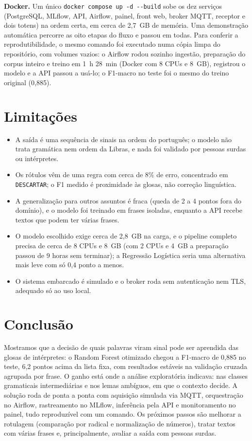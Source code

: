 \documentclass[12pt]{article}
\begin{document}
\textbf{Docker.} Um único \texttt{docker compose up -d -{}-build} sobe os dez serviços (PostgreSQL,
MLflow, API, Airflow, painel, front web, broker MQTT, receptor e dois totens) na ordem certa, em cerca de
2,7~GB de memória. Uma demonstração automática percorre as oito etapas do fluxo e passou em todas.
Para conferir a reprodutibilidade, o mesmo comando foi executado numa cópia limpa do repositório, com
volumes vazios: o Airflow rodou sozinho ingestão, preparação do corpus inteiro e treino em 1~h 28~min
(Docker com 8 CPUs e 8~GB), registrou o modelo e a API passou a usá-lo; o F1-macro no teste foi o
mesmo do treino original (0,885).

\section{Limitações}\label{sec:limitacoes}

\begin{itemize}
\item A saída é uma sequência de sinais na ordem do português; o modelo não trata gramática nem
  ordem da Libras, e nada foi validado por pessoas surdas ou intérpretes.
\item Os rótulos vêm de uma regra com cerca de 8\% de erro, concentrado em \texttt{DESCARTAR}; o F1
  medido é proximidade às glosas, não correção linguística.
\item A generalização para outros assuntos é fraca (queda de 2 a 4 pontos fora do domínio), e o
  modelo foi treinado em frases isoladas, enquanto a API recebe textos que podem ter várias frases.
\item O modelo escolhido exige cerca de 2,8~GB na carga, e o pipeline completo precisa de cerca de
  8 CPUs e 8~GB (com 2 CPUs e 4~GB a preparação passou de 9 horas sem terminar); a Regressão Logística
  seria uma alternativa mais leve com só 0,4 ponto a menos.
\item O sistema embarcado é simulado e o broker roda sem autenticação nem TLS, adequado só ao uso
  local.
\end{itemize}

\section{Conclusão}\label{sec:conclusao}

Mostramos que a decisão de quais palavras viram sinal pode ser aprendida das glosas de intérpretes: o
Random Forest otimizado chegou a F1-macro de 0,885 no teste, 6,2 pontos acima da lista fixa, com
resultados estáveis na validação cruzada agrupada por frase. O ganho está onde a análise exploratória
indicava: nas classes gramaticais intermediárias e nos lemas ambíguos, em que o contexto decide. A
solução roda de ponta a ponta com aquisição simulada via MQTT, orquestração no Airflow, rastreamento
no MLflow, inferência pela API e monitoramento no painel, tudo reproduzível com um comando. Os
próximos passos são melhorar a rotulagem (comparação por radical e normalização de números), tratar
textos com várias frases e, principalmente, avaliar a saída com pessoas surdas.



\end{document}
